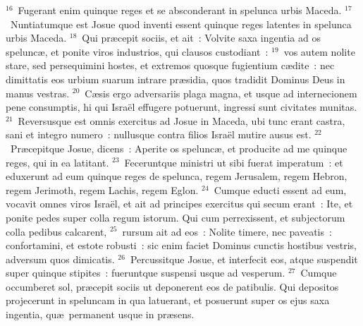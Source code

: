 ${}^{16}$~Fugerant enim quinque reges et se absconderant in spelunca urbis Maceda.
${}^{17}$~Nuntiatumque est Josue quod inventi essent quinque reges latentes in spelunca urbis Maceda.
${}^{18}$~Qui pr\ae cepit sociis, et ait~: Volvite saxa ingentia ad os spelunc\ae , et ponite viros industrios, qui clausos custodiant~:
${}^{19}$~vos autem nolite stare, sed persequimini hostes, et extremos quosque fugientium c\ae dite~: nec dimittatis eos urbium suarum intrare pr\ae sidia, quos tradidit Dominus Deus in manus vestras.
${}^{20}$~C\ae sis ergo adversariis plaga magna, et usque ad internecionem pene consumptis, hi qui Isra\"el effugere potuerunt, ingressi sunt civitates munitas.
${}^{21}$~Reversusque est omnis exercitus ad Josue in Maceda, ubi tunc erant castra, sani et integro numero~: nullusque contra filios Isra\"el mutire ausus est.
${}^{22}$~Pr\ae cepitque Josue, dicens~: Aperite os spelunc\ae , et producite ad me quinque reges, qui in ea latitant.
${}^{23}$~Feceruntque ministri ut sibi fuerat imperatum~: et eduxerunt ad eum quinque reges de spelunca, regem Jerusalem, regem Hebron, regem Jerimoth, regem Lachis, regem Eglon.
${}^{24}$~Cumque educti essent ad eum, vocavit omnes viros Isra\"el, et ait ad principes exercitus qui secum erant~: Ite, et ponite pedes super colla regum istorum. Qui cum perrexissent, et subjectorum colla pedibus calcarent,
${}^{25}$~rursum ait ad eos~: Nolite timere, nec paveatis~: confortamini, et estote robusti~: sic enim faciet Dominus cunctis hostibus vestris, adversum quos dimicatis.
${}^{26}$~Percussitque Josue, et interfecit eos, atque suspendit super quinque stipites~: fueruntque suspensi usque ad vesperum.
${}^{27}$~Cumque occumberet sol, pr\ae cepit sociis ut deponerent eos de patibulis. Qui depositos projecerunt in speluncam in qua latuerant, et posuerunt super os ejus saxa ingentia, qu\ae\ permanent usque in pr\ae sens.


